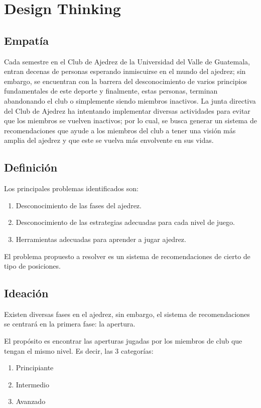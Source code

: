 \section{Design Thinking}
\subsection{Empatía}

Cada semestre en el Club de Ajedrez de la Universidad del Valle de Guatemala, entran decenas de personas esperando inmiscuirse en el mundo del ajedrez; sin embargo, se encuentran con la barrera del desconocimiento de varios principios fundamentales de este deporte y finalmente, estas personas, terminan abandonando el club o simplemente siendo miembros inactivos. \newline\newline
La junta directiva del Club de Ajedrez ha intentando implementar diversas actividades para evitar que los miembros se vuelven inactivos; por lo cual, se busca generar un sistema de recomendaciones que ayude a los miembros del club a tener una visión más amplia del ajedrez y que este se vuelva más envolvente en sus vidas.

\subsection{Definición}
Los principales problemas identificados son: 
\begin{enumerate}
    \item Desconocimiento de las fases del ajedrez. 
    \item Desconocimiento de las estrategias adecuadas para cada nivel de juego. 
    \item Herramientas adecuadas para aprender a jugar ajedrez.
\end{enumerate}

El problema propuesto a resolver es un sistema de recomendaciones de cierto de tipo de posiciones. 

\subsection{Ideación}
Existen diversas fases en el ajedrez, sin embargo, el sistema de recomendaciones se centrará en la primera fase: la apertura. 

El propósito es encontrar las aperturas jugadas por los miembros de club que tengan el mismo nivel. Es decir, las 3 categorías: 
\begin{enumerate}
    \item Principiante 
    \item Intermedio 
    \item Avanzado 
\end{enumerate}
